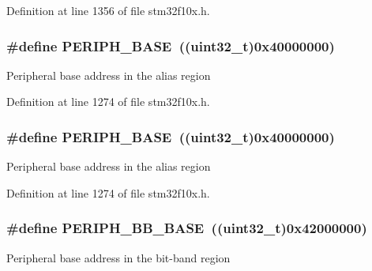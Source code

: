 Definition at line 1356 of file stm32f10x.\+h.

\subsubsection[{\texorpdfstring{P\+E\+R\+I\+P\+H\+\_\+\+B\+A\+SE}{PERIPH_BASE}}]{\setlength{\rightskip}{0pt plus 5cm}\#define P\+E\+R\+I\+P\+H\+\_\+\+B\+A\+SE~(({\bf uint32\+\_\+t})0x40000000)}\hypertarget{group___peripheral__memory__map_ga9171f49478fa86d932f89e78e73b88b0}{}\label{group___peripheral__memory__map_ga9171f49478fa86d932f89e78e73b88b0}
Peripheral base address in the alias region 

Definition at line 1274 of file stm32f10x.\+h.

\subsubsection[{\texorpdfstring{P\+E\+R\+I\+P\+H\+\_\+\+B\+A\+SE}{PERIPH_BASE}}]{\setlength{\rightskip}{0pt plus 5cm}\#define P\+E\+R\+I\+P\+H\+\_\+\+B\+A\+SE~(({\bf uint32\+\_\+t})0x40000000)}\hypertarget{group___peripheral__memory__map_ga9171f49478fa86d932f89e78e73b88b0}{}\label{group___peripheral__memory__map_ga9171f49478fa86d932f89e78e73b88b0}
Peripheral base address in the alias region 

Definition at line 1274 of file stm32f10x.\+h.

\subsubsection[{\texorpdfstring{P\+E\+R\+I\+P\+H\+\_\+\+B\+B\+\_\+\+B\+A\+SE}{PERIPH_BB_BASE}}]{\setlength{\rightskip}{0pt plus 5cm}\#define P\+E\+R\+I\+P\+H\+\_\+\+B\+B\+\_\+\+B\+A\+SE~(({\bf uint32\+\_\+t})0x42000000)}\hypertarget{group___peripheral__memory__map_gaed7efc100877000845c236ccdc9e144a}{}\label{group___peripheral__memory__map_gaed7efc100877000845c236ccdc9e144a}
Peripheral base address in the bit-\/band region 

